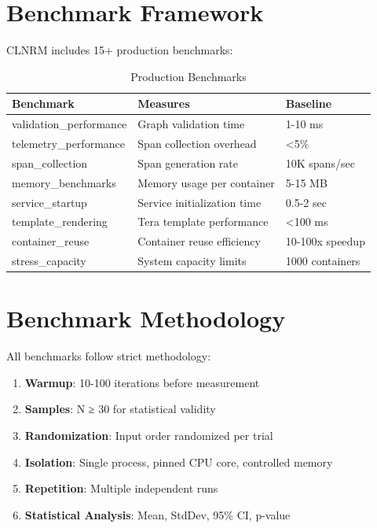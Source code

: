 \documentclass[12pt,twoside,openright]{book}
\theoremstyle{plain}
\theoremstyle{definition}
\theoremstyle{remark}
\begin{document}
\section{Benchmark Framework}

CLNRM includes 15+ production benchmarks:

\begin{table}[H]
\centering
\small
\begin{tabular}{|l|p{2.5cm}|p{1.5cm}|}
\hline
\textbf{Benchmark} & \textbf{Measures} & \textbf{Baseline} \\
\hline
validation\_performance & Graph validation time & 1-10 ms \\
\hline
telemetry\_performance & Span collection overhead & <5\% \\
\hline
span\_collection & Span generation rate & 10K spans/sec \\
\hline
memory\_benchmarks & Memory usage per container & 5-15 MB \\
\hline
service\_startup & Service initialization time & 0.5-2 sec \\
\hline
template\_rendering & Tera template performance & <100 ms \\
\hline
container\_reuse & Container reuse efficiency & 10-100x speedup \\
\hline
stress\_capacity & System capacity limits & 1000 containers \\
\hline
\end{tabular}
\caption{Production Benchmarks}
\label{tab:benchmarks}
\end{table}

\section{Benchmark Methodology}

All benchmarks follow strict methodology:

\begin{enumerate}
  \item \textbf{Warmup}: 10-100 iterations before measurement
  \item \textbf{Samples}: N ≥ 30 for statistical validity
  \item \textbf{Randomization}: Input order randomized per trial
  \item \textbf{Isolation}: Single process, pinned CPU core, controlled memory
  \item \textbf{Repetition}: Multiple independent runs
  \item \textbf{Statistical Analysis}: Mean, StdDev, 95\% CI, p-value
\end{enumerate}
\end{document}
